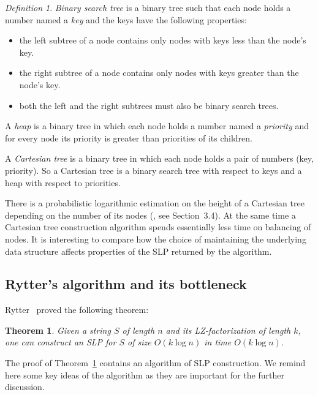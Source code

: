 ﻿\documentclass[11pt]{article}
\newtheorem{thm}{Theorem}[section]
\theoremstyle{remark}
\newtheorem{definition}{Definition}[section]
\begin{document}
\begin{definition}
\emph{Binary search tree} is a binary tree such that each node holds a number named a \emph{key} and the keys have the following
properties:

\begin{itemize}
  \item the left subtree of a node contains only nodes with keys less than the node's key.
  \item the right subtree of a node contains only nodes with keys greater than the node's key.
  \item both the left and the right subtrees must also be binary search trees.
\end{itemize}
  
A \emph{heap} is a binary tree in which each node holds a number named a \emph{priority} and for every node its
priority is greater than priorities of its children.

A \emph{Cartesian tree} is a binary tree in which each node holds a pair of numbers (key, priority). So a Cartesian tree is a binary search
tree with respect to keys and a heap with respect to priorities.
\end{definition}

There is a probabilistic logarithmic estimation on the height of a Cartesian tree depending on the number of its nodes
(\!\!\cite{Seidel&Aragon:1996}, see Section \,3.4). At the same time a Cartesian tree construction algorithm spends
essentially less time on balancing of nodes. It is interesting to compare how the choice of maintaining the underlying data structure
affects properties of the SLP returned by the algorithm.

\subsection{Rytter's algorithm and its bottleneck} Rytter~\cite{SLPConstruction} proved the following theorem:

\begin{thm}
\label{thm:rytter}
Given a string $S$ of length $n$ and its LZ-factorization of length $k$, one can construct an SLP for $S$ of size $O(k
\log n)$ in time $O(k \log n)$.
\end{thm}

The proof of Theorem~\ref{thm:rytter} contains an algorithm of SLP construction. We remind here some key ideas of the
algorithm as they are important for the further discussion. 
\end{document}
